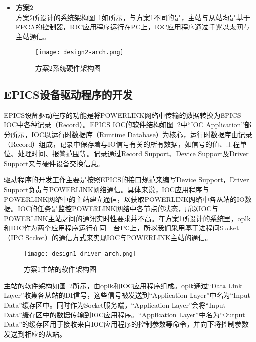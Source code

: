\begin{itemize}

\item \textbf{方案2} \\ 
方案2所设计的系统架构图~\ref{fig:design2-arch}如所示，与方案1不同的是，主站与从站均是基于FPGA的控制器，IOC应用程序运行在PC上，IOC应用程序通过千兆以太网与主站通信。

\begin{figure}[!htb]
  \centering
  \texttt{[image: design2-arch.png]}
  \caption{方案2系统硬件架构图}
  \label{fig:design2-arch}
\end{figure}

\end{itemize}

\subsection{EPICS设备驱动程序的开发}

EPICS设备驱动程序的功能是将POWERLINK网络中传输的数据转换为EPICS IOC中各种记录（Record）。EPICS IOC的软件结构如图~\ref{fig:design1-driver-arch}中“IOC Application”部分所示，IOC以运行时数据库（Runtime Database）为核心，运行时数据库由记录（Record）组成，记录中保存着与IO信号有关的所有数据，如信号的值、工程单位、处理时间、报警范围等。记录通过Record Support、Device Support及Driver Support来与硬件设备交换信息。

驱动程序的开发工作主要是按照EPICS的接口规范来编写Device Support，Driver Support负责与POWERLINK网络通信。具体来说，IOC应用程序与POWERLINK网络中的主站建立通信，以获取POWERLINK网络中各从站的IO数据。IOC的任务是监控POWERLINK网络中各节点的状态，所以IOC与POWERLINK主站之间的通讯实时性要求并不高。在方案1所设计的系统里，oplk和IOC作为两个应用程序运行在同一台PC上，所以我们采用基于进程间Socket（IPC Socket）的通信方式来实现IOC与POWERLINK主站的通信。

\begin{figure}[!htb]
  \centering
  \texttt{[image: design1-driver-arch.png]}
  \caption{方案1主站的软件架构图}
  \label{fig:design1-driver-arch}
\end{figure}

主站的软件架构如图~\ref{fig:design1-driver-arch}所示，由oplk和IOC应用程序组成。oplk通过“Data Link Layer”收集各从站的DI信号，这些信号被发送到“Application Layer”中名为“Input Data”缓存区中。同时作为Socket服务端，“Application Layer”会将“Input Data”缓存区中的数据传输到IOC应用程序。“Application Layer”中名为“Output Data”的缓存区用于接收来自IOC应用程序的控制参数等命令，并向下将控制参数发送到相应的从站。

